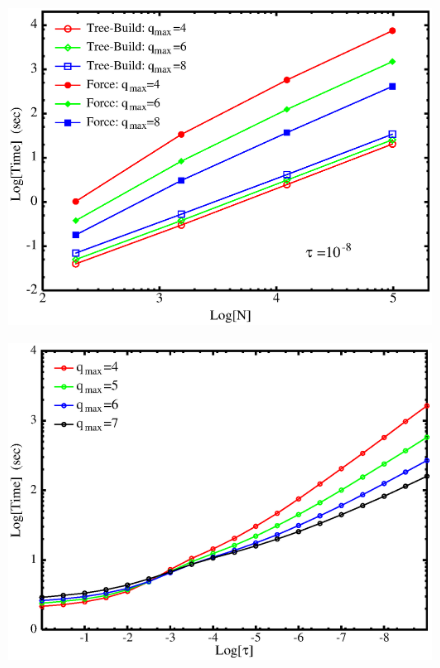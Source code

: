\documentclass[prb,aps,nobibnotes,superbib,preprint]{revtex4}
\begin{document}
\begin{figure}
\caption{}
{\centering \includegraphics {Time_vs_N_water_2.ps} \par} 
\label{figure:TimeVsNwater} 
\end{figure}

\begin{figure}
\caption{}
{\centering \includegraphics {Time_vs_Tau_W4096.ps} \par} 
\label{figure:TimeVsTauWater4096} 
\end{figure}
\end{document}

